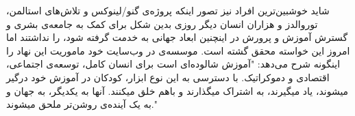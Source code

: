 شاید خوشبین‌ترین افراد نیز تصور اینکه پروژه‌ی گنو/لینوکس و تلاش‌های استالمن، توروالدز و هزاران انسان دیگر روزی بدین شکل برای کمک به جامعه‌ی بشری و گسترش آموزش و پرورش در اینچنین ابعاد جهانی به خدمت گرفته شود، را نداشتند اما امروز این خواسته محقق گشته است. موسسه‌ی 
 در وب‌سایت خود ماموریت این نهاد را اینگونه شرح می‌دهد:
"آموزش شالوده‌ای است برای انسان کامل، توسعه‌ی اجتماعی، اقتصادی و دموکراتیک. با دسترسی به این نوع ابزار، کودکان در آموزش خود درگیر میشوند، یاد میگیرند، به اشتراک میگذارند و باهم خلق میکنند. آنها به یکدیگر، به جهان و به یک آینده‌ی روشن‌تر ملحق میشوند."

\begin{figure} [H]
	\hfill 
\end{figure}





